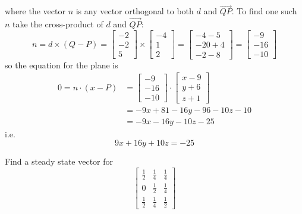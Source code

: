 \documentclass{article}
\begin{document}
\begin{Answer}
  where the vector $n$ is any vector orthogonal to both $d$ and $\vec{QP}$.
  To find one such $n$ take the cross-product of $d$ and $\vec{QP}$:
  \begin{equation*}
  n = d\times (Q-P) = \left[
  \begin{array}{c}
  -2\\
  -2\\
  5
  \end{array}
  \right] \times \left[
  \begin{array}{c}
  -4\\
  1\\
  2
  \end{array}
  \right] = \left[
  \begin{array}{c}
  -4-5\\
  -20+4\\
  -2-8
  \end{array}
  \right] = \left[
  \begin{array}{c}
  -9\\
  -16\\
  -10
  \end{array}
  \right]
  \end{equation*}
  so the equation for the plane is
  \begin{align*}
    0 = n\cdot (x-P) &= \left[
    \begin{array}{c}
    -9\\
    -16\\
    -10
    \end{array}
    \right]\cdot \left[
    \begin{array}{c}
    x-9\\
    y+6\\
    z+1
    \end{array}
    \right] \\
    &= -9x +81 -16y-96 -10z -10\\
    & = -9x -16y -10z -25
  \end{align*}
  i.e. 
  \begin{equation*}
  9x+16y+10z = -25
  \end{equation*}
\end{Answer}

\begin{Exercise}
  Find a steady state vector for
  \begin{equation*}
  \left[
  \begin{array}{ccc}
  \frac{1}{2} & \frac{1}{4} & \frac{1}{4}\\
  0 & \frac{1}{2} & \frac{1}{4}\\
  \frac{1}{2} & \frac{1}{4} & \frac{1}{2}
  \end{array}
  \right]
  \end{equation*}
\end{Exercise}
\end{document}
